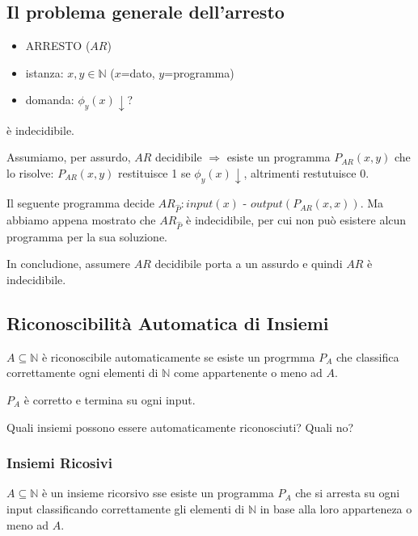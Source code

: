 \documentclass{article}
\begin{document}
\subsection{Il problema generale dell'arresto}
\begin{itemize}
	\item ARRESTO ($AR$)
	\item istanza: $x,y \in \mathbb{N}$ ($x$=dato, $y$=programma)
	\item domanda: $\phi_y(x)\downarrow$?
\end{itemize}
è indecidibile.




Assumiamo, per assurdo, $AR$ decidibile $\Rightarrow$ esiste un programma $P_{AR}(x,y)$ che lo risolve: $P_{AR}(x,y)$ restituisce 1 se $\phi_y(x)\downarrow$, altrimenti restutuisce 0.




Il seguente programma decide $AR_{\hat{P}}: input(x)$ - $output(P_{AR}(x,x))$. Ma abbiamo appena mostrato che $AR_{\hat{P}}$ è indecidibile, per cui non può esistere alcun programma per la sua soluzione.



In concludione, assumere $AR$ decidibile porta a un assurdo e quindi $AR$ è indecidibile.




\subsection{Riconoscibilità Automatica di Insiemi}
$A \subseteq \mathbb{N}$ è riconoscibile automaticamente se esiste un progrmma $P_A$ che classifica correttamente ogni elementi di $\mathbb{N}$ come appartenente o meno ad $A$.




$P_A$ è corretto e termina su ogni input.





Quali insiemi possono essere automaticamente riconosciuti? Quali no?

\subsubsection{Insiemi Ricosivi}
$A \subseteq \mathbb{N}$ è un insieme ricorsivo sse esiste un programma $P_A$ che si arresta su ogni input classificando correttamente gli elementi di $\mathbb{N}$ in base alla loro apparteneza o meno ad $A$.
\end{document}
